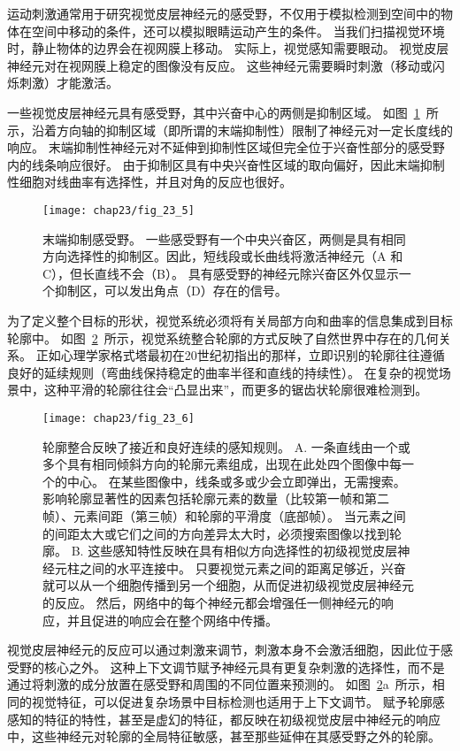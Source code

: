 运动刺激通常用于研究视觉皮层神经元的感受野，不仅用于模拟检测到空间中的物体在空间中移动的条件，还可以模拟眼睛运动产生的条件。
当我们扫描视觉环境时，静止物体的边界会在视网膜上移动。
实际上，视觉感知需要眼动。
视觉皮层神经元对在视网膜上稳定的图像没有反应。
这些神经元需要瞬时刺激（移动或闪烁刺激）才能激活。


一些视觉皮层神经元具有感受野，其中兴奋中心的两侧是抑制区域。
如图~\ref{fig:23_5}~所示，沿着方向轴的抑制区域（即所谓的末端抑制性）限制了神经元对一定长度线的响应。
末端抑制性神经元对不延伸到抑制性区域但完全位于兴奋性部分的感受野内的线条响应很好。
由于抑制区具有中央兴奋性区域的取向偏好，因此末端抑制性细胞对线曲率有选择性，并且对角的反应也很好。


\begin{figure}[htbp]
	\centering
	\texttt{[image: chap23/fig\_23\_5]}
	\caption{末端抑制感受野。
		一些感受野有一个中央兴奋区，两侧是具有相同方向选择性的抑制区。因此，短线段或长曲线将激活神经元（A 和 C），但长直线不会（B）。
		具有感受野的神经元除兴奋区外仅显示一个抑制区，可以发出角点（D）存在的信号。}
	\label{fig:23_5}
\end{figure}


为了定义整个目标的形状，视觉系统必须将有关局部方向和曲率的信息集成到目标轮廓中。
如图~\ref{fig:23_6}~所示，视觉系统整合轮廓的方式反映了自然世界中存在的几何关系。
正如心理学家格式塔最初在20世纪初指出的那样，立即识别的轮廓往往遵循良好的延续规则（弯曲线保持稳定的曲率半径和直线的持续性）。
在复杂的视觉场景中，这种平滑的轮廓往往会“凸显出来”，而更多的锯齿状轮廓很难检测到。


\begin{figure}[htbp]
	\centering
	\texttt{[image: chap23/fig\_23\_6]}
	\caption{轮廓整合反映了接近和良好连续的感知规则\cite{li2002global}。
		A. 一条直线由一个或多个具有相同倾斜方向的轮廓元素组成，出现在此处四个图像中每一个的中心。
		在某些图像中，线条或多或少会立即弹出，无需搜索。
		影响轮廓显著性的因素包括轮廓元素的数量（比较第一帧和第二帧）、元素间距（第三帧）和轮廓的平滑度（底部帧）。
		当元素之间的间距太大或它们之间的方向差异太大时，必须搜索图像以找到轮廓。
		B. 这些感知特性反映在具有相似方向选择性的初级视觉皮层神经元柱之间的水平连接中。
		只要视觉元素之间的距离足够近，兴奋就可以从一个细胞传播到另一个细胞，从而促进初级视觉皮层神经元的反应。
		然后，网络中的每个神经元都会增强任一侧神经元的响应，并且促进的响应会在整个网络中传播。}
	\label{fig:23_6}
\end{figure}


视觉皮层神经元的反应可以通过刺激来调节，刺激本身不会激活细胞，因此位于感受野的核心之外。
这种上下文调节赋予神经元具有更复杂刺激的选择性，而不是通过将刺激的成分放置在感受野和周围的不同位置来预测的。
如图~\ref{fig:23_6}a~所示，相同的视觉特征，可以促进复杂场景中目标检测也适用于上下文调节。
赋予轮廓感感知的特征的特性，甚至是虚幻的特征，都反映在初级视觉皮层中神经元的响应中，这些神经元对轮廓的全局特征敏感，甚至那些延伸在其感受野之外的轮廓。


